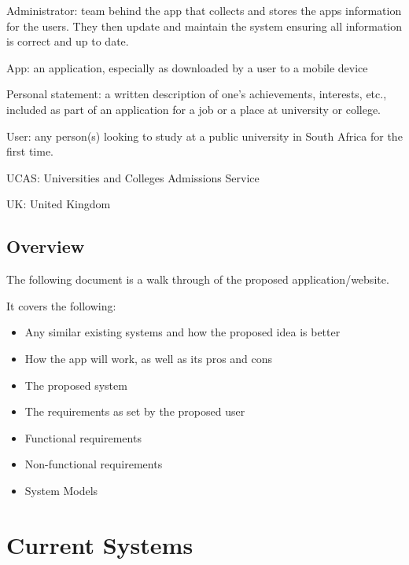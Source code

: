 \documentclass[a4paper, 12pt]{article}
\begin{document}
Administrator: team behind the app that collects and stores the apps information for the users. They then update and maintain the system ensuring all information is correct and up to date.

App: an application, especially as downloaded by a user to a mobile device

Personal statement: a written description of one's achievements, interests, etc., included as part of an application for a job or a place at university or college.

User: any person(s) looking to study at a public university in South Africa for the first time.

UCAS: Universities and Colleges Admissions Service

UK: United Kingdom 


\subsection{Overview}

The following document is a walk through of the proposed application/website.

It covers the following:
\begin{itemize}
\item Any similar existing systems and how the proposed idea is better 
\item How the app will work, as well as its pros and cons
\item The proposed system
\item The requirements as set by the proposed user 
\item Functional requirements 
\item Non-functional requirements 
\item System Models
\end{itemize}

\newpage
\section{Current Systems}
\end{document}
